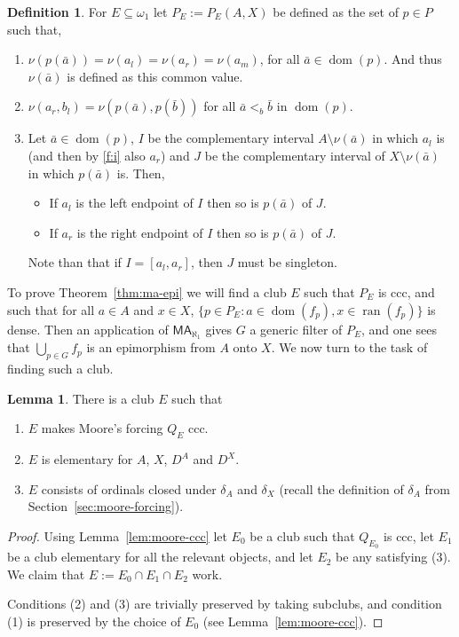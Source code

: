 \documentclass[10pt]{amsart}
\theoremstyle{definition}
\newtheorem{definition}[theorem]{Definition}
\newtheorem{lemma}[theorem]{Lemma}
\theoremstyle{remark}
\newcommand{\seb}{\subseteq}
\newcommand{\setm}{\setminus}
\newcommand{\axiom}[1]{\mathsf{#1}}
\newcommand{\MA}{\axiom{MA}}
\newcommand{\ba}{\bar{a}}
\newcommand{\1}{\mathbbm{1}}
\DeclareMathOperator{\dom}{dom}
\DeclareMathOperator{\ran}{ran}
\begin{document}
\begin{definition}\label{df:forcing}
  For $E\seb \omega_{1}$ let $P_{E} := P_{E}(A,X)$ be defined as the set
  of $p \in P$ such that,
  \begin{enumerate}[label = (\roman*)]\itemsep0em
    \item\label{f:i} $\nu(p(\bar{a})) = \nu(a_{l}) = \nu(a_{r}) = \nu(a_{m})$,
    for all $\bar{a} \in \dom(p)$. And thus $\nu(\ba)$ is defined as this common value.
    \item\label{f:ii} $\nu(a_{r},b_{l}) = \nu(p(\bar{a}),p(\bar{b}))$
    for all $\bar{a} <_{b} \bar{b}$ in $\dom(p)$.
    \item\label{f:iii} Let $\bar{a} \in \dom(p)$,
    $I$ be the complementary interval $A \setm \nu(\ba)$
    in which $a_{l}$ is (and then by \ref{f:i} also $a_{r}$)
    and $J$ be the complementary interval of $X \setm \nu(\ba)$
    in which $p(\ba)$ is. Then,
    \begin{itemize}\itemsep0em
      \item If $a_{l}$ is the left endpoint of $I$ then so is $p(\ba)$ of $J$.
      \item If $a_{r}$ is the right endpoint of $I$ then so is $p(\ba)$ of $J$.
    \end{itemize}
    Note than that if $I = [a_{l},a_{r}]$, then $J$ must be singleton.
  \end{enumerate}
\end{definition}


To prove Theorem~\ref{thm:ma-epi} we will find
a club $E$ such that $P_{E}$ is ccc, and such that
for all $a \in A$ and $x \in X$,
$\{p \in P_{E} : a \in \dom(f_{p}), x \in \ran(f_{p})\}$ is dense.
Then an application of $\MA_{\aleph_{1}}$ gives $G$
a generic filter of $P_{E}$, and one sees that
$\bigcup_{p \in G}f_{p}$ is an epimorphism from $A$ onto $X$.
We now turn to the task of finding such a club.

\begin{lemma}\label{lem:ex-club}
  There is a club $E$ such that
  \begin{enumerate}[label = (\arabic*)]\itemsep0em
    \item $E$ makes Moore's forcing $Q_{E}$ ccc.
    \item $E$ is elementary for $A$, $X$, $D^{A}$ and $D^{X}$.
    \item $E$ consists of ordinals closed under $\delta_{A}$ and $\delta_{X}$
    (recall the definition of $\delta_{A}$ from Section~\ref{sec:moore-forcing}).
  \end{enumerate}
\end{lemma}
\begin{proof}
  Using Lemma~\ref{lem:moore-ccc} let $E_{0}$ be a club such that $Q_{E_{0}}$
  is ccc, let $E_{1}$ be a club elementary for all the relevant objects,
  and let $E_{2}$ be any satisfying (3). We claim
  that $E := E_{0} \cap E_{1} \cap E_{2}$ work.

  Conditions (2) and (3) are trivially preserved by taking subclubs, and
  condition (1) is preserved by the choice of $E_{0}$
  (see Lemma~\ref{lem:moore-ccc}).
\end{proof}
\end{document}
